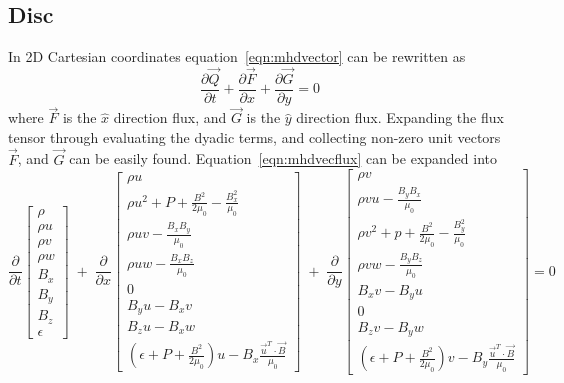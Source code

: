 \documentclass[paper=a4, fontsize=11pt]{scrartcl}
\newcommand{\pfrac}[2]{\frac{\partial#1}{\partial#2}}
\numberwithin{equation}{section}                %
\numberwithin{figure}{section}                  %
\numberwithin{table}{section}                           %
\begin{document}
\subsection{Disc}
In 2D Cartesian coordinates equation~\ref{eqn:mhdvector} can be rewritten as 
\begin{equation} \label{eqn:mhdvecflux}
  \pfrac{\vec{Q}}{t} + \pfrac{\vec{F}}{x} + \pfrac{\vec{G}}{y} = 0
\end{equation}
where $\vec{F}$ is the $\hat{x}$ direction flux, and $\vec{G}$ is the $\hat{y}$ direction flux. Expanding the flux tensor through evaluating the dyadic terms, and collecting non-zero unit vectors $\vec{F}$, and $\vec{G}$ can be easily found. Equation~\ref{eqn:mhdvecflux} can be expanded into  
\[
  \pfrac{}{t}
  \begin{bmatrix}
    \rho  \\
    \rho u  \\
    \rho v \\
    \rho w \\
    B_x \\
    B_y \\
    B_z \\
    \epsilon
  \end{bmatrix}
  \;+\;\pfrac{}{x}
  \begin{bmatrix}
    \rho u  \\
    \rho u^2 + P + \frac{B^2}{2 \mu_0} - \frac{B_x^2}{\mu_0} \\
    \rho u v - \frac{B_x B_y}{\mu_0} \\
    \rho u w - \frac{B_x B_z}{\mu_0} \\
    0 \\
    B_y u - B_x v \\
    B_z u - B_x w \\
    \left(\epsilon+ P + \frac{B^2}{2 \mu_0} \right) u - B_x\frac{\vec{u}^T\cdot\vec{B}}{\mu_0}
  \end{bmatrix}
  \;+\;\pfrac{}{y}
  \begin{bmatrix}
    \rho v  \\
    \rho v u - \frac{B_y B_x}{\mu_0} \\
    \rho v^2 + p + \frac{B^2}{2 \mu_0} - \frac{B_y^2}{\mu_0} \\
    \rho v w - \frac{B_y B_z}{\mu_0} \\
    B_x v - B_y u \\
    0 \\
    B_z v - B_y w \\
    \left(\epsilon+ P + \frac{B^2}{2 \mu_0} \right) v - B_y\frac{\vec{u}^T\cdot\vec{B}}{\mu_0}
  \end{bmatrix}
  =0
\]
\end{document}
